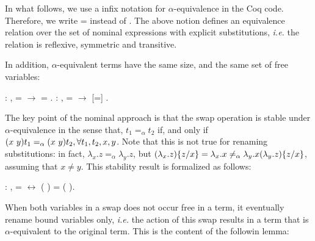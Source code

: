 In what follows, we use a infix notation for $\alpha$-equivalence in the Coq code. Therefore, we write  =  instead of   . The above notion defines an equivalence relation over the set  of nominal expressions with explicit substitutions, {\it i.e.} the  relation is reflexive, symmetric and transitive. 
\begin{coqdoccode}
\end{coqdoccode}
In addition, $\alpha$-equivalent terms have the same size, and the same set of free variables: 
\begin{coqdoccode}
\coqdocemptyline
\coqdocnoindent
{} : \coqdockw{\ensuremath{\forall}}  ,  =  \ensuremath{\rightarrow}   =  .\coqdoceol
\coqdocnoindent
{}  : \coqdockw{\ensuremath{\forall}}  ,  =  \ensuremath{\rightarrow}   [=]  .\coqdoceol
\coqdocemptyline
\end{coqdoccode}
The key point of the nominal approach is that the swap operation is stable under $\alpha$-equivalence in the sense that, $t_1 =_\alpha t_2$ if, and only if $(x\ y) t_1 =_\alpha (x\ y) t_2, \forall t_1, t_2, x, y$. Note that this is not true for renaming substitutions: in fact, $\lambda_x.z =_\alpha \lambda_y.z$, but $(\lambda_x.z)\{z / x\} = \lambda_x.x \neq_\alpha \lambda_y.x (\lambda_y.z)\{z / x\}$, assuming that $x \neq y$. This stability result is formalized as follows: 
\begin{coqdoccode}
\coqdocemptyline
\coqdocnoindent
{} : \coqdockw{\ensuremath{\forall}}    ,  =  \ensuremath{\leftrightarrow} (   ) = (   ).\coqdoceol
\coqdocemptyline
\coqdocemptyline
\end{coqdoccode}
When both variables in a swap does not occur free in a term, it eventually rename bound variables only, {\it i.e.} the action of this swap results in a term that is $\alpha$-equivalent to the original term. This is the content of the followin lemma:
